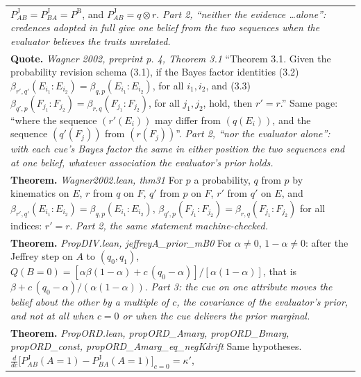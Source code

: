 \documentclass[10pt]{article}
\theoremstyle{definition}
\newcommand{\PB}{P^{\mathrm{B}}}
\newcommand{\PJ}{P^{\mathrm{J}}}
\newlength{\fullw}\setlength{\fullw}{25.9cm}
\begin{document}
{\begin{longtable}{|p{0.9cm}|p{12.2cm}|p{12.2cm}|}
{$\PJ_{AB}=\PJ_{BA}=\PB$, and $\PJ_{AB}=q\otimes r$. \newline \textit{Part 2, ``neither the evidence \ldots alone'': credences adopted in full give one belief from the two sequences when the evaluator believes the traits unrelated.}} \\
\multicolumn{3}{|p{\fullw}|}{\textbf{Quote.} \textit{Wagner 2002, preprint p. 4, Theorem 3.1} \newline ``Theorem 3.1. Given the probability revision schema (3.1), if the Bayes factor
identities (3.2) $\beta_{r',q'}(E_{i_1}:E_{i_2})=\beta_{q,p}(E_{i_1}:E_{i_2})$, for all
$i_1,i_2$, and (3.3) $\beta_{q',p}(F_{j_1}:F_{j_2})=\beta_{r,q}(F_{j_1}:F_{j_2})$, for
all $j_1,j_2$, hold, then $r'=r$.'' Same page: ``where the sequence $(r'(E_i))$ may
differ from $(q(E_i))$, and the sequence $(q'(F_j))$ from $(r(F_j))$''. \newline \textit{Part 2, ``nor the evaluator alone'': with each cue's Bayes factor the same in either position the two sequences end at one belief, whatever association the evaluator's prior holds.}} \\
\multicolumn{3}{|p{\fullw}|}{\textbf{Theorem.} \textit{Wagner2002.lean, thm31} \newline For $p$ a probability, $q$ from $p$ by kinematics on $E$, $r$ from $q$ on $F$,
$q'$ from $p$ on $F$, $r'$ from $q'$ on $E$, and
$\beta_{r',q'}(E_{i_1}:E_{i_2})=\beta_{q,p}(E_{i_1}:E_{i_2})$,
$\beta_{q',p}(F_{j_1}:F_{j_2})=\beta_{r,q}(F_{j_1}:F_{j_2})$ for all indices:
$r'=r$. \newline \textit{Part 2, the same statement machine-checked.}} \\
\multicolumn{3}{|p{\fullw}|}{\textbf{Theorem.} \textit{PropDIV.lean, jeffreyA\_prior\_mB0} \newline For $\alpha\neq0$, $1-\alpha\neq0$: after the Jeffrey step on $A$ to $(q_0,q_1)$,
$Q(B{=}0)=[\alpha\beta(1-\alpha)+c\,(q_0-\alpha)]/[\alpha(1-\alpha)]$, that is
$\beta+c\,(q_0-\alpha)/(\alpha(1-\alpha))$. \newline \textit{Part 3: the cue on one attribute moves the belief about the other by a multiple of $c$, the covariance of the evaluator's prior, and not at all when $c=0$ or when the cue delivers the prior marginal.}} \\
\multicolumn{3}{|p{\fullw}|}{\textbf{Theorem.} \textit{PropORD.lean, propORD\_Amarg, propORD\_Bmarg, propORD\_const, propORD\_Amarg\_eq\_negKdrift} \newline Same hypotheses. $\frac{d}{dc}\bigl[\PJ_{AB}(A{=}1)-\PJ_{BA}(A{=}1)\bigr]_{c=0}=\kappa'$,
}
\end{longtable}}
\end{document}
